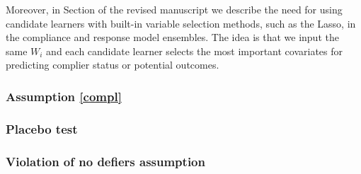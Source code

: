 \documentclass[hidelinks,12pt,letterpaper]{article}
\begin{document}
Moreover, in Section \label{ensemble} of the revised manuscript we describe the need for using candidate learners with built-in variable selection methods, such as the Lasso, in the compliance and response model ensembles. The idea is that we input the same $W_i$ and each candidate learner selects the most important covariates for predicting complier status or potential outcomes. 

\subsubsection{Assumption \ref{compl}}



\subsubsection{Placebo test}

\subsubsection{Violation of no defiers assumption}
\end{document}
